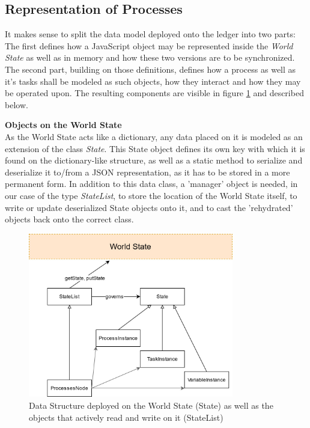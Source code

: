 \subsection{Representation of Processes}
\label{sec:impr:hl:datastructure}

It makes sense to split the data model deployed onto the ledger into two parts: The first defines how a JavaScript object may be represented inside the \emph{World State} as well as in memory and how these two versions are to be synchronized. The second part, building on those definitions, defines how a process as well as it's tasks shall be modeled as such objects, how they interact and how they may be operated upon. The resulting components are visible in figure \ref{fig:impr:hl:data} and described below.

\textbf{Objects on the World State} \\[0.2em]
As the World State acts like a dictionary, any data placed on it is modeled as an extension of the class \emph{State}. This State object defines its own key with which it is found on the dictionary-like structure, as well as a static method to serialize and deserialize it to/from a JSON representation, as it has to be stored in a more permanent form. \newline
In addition to this data class, a 'manager' object is needed, in our case of the type \emph{StateList}, to store the location of the World State itself, to write or update deserialized State objects onto it, and to cast the 'rehydrated' objects back onto the correct class.

\begin{figure}[h]
	\centering
	\captionsetup{justification=centering,margin=2cm}
	\includegraphics[width=0.8\textwidth]{gfx/hl-data}
	\caption{Data Structure deployed on the World State (State) as well as the objects that actively read and write on it (StateList)}
	\label{fig:impr:hl:data}
\end{figure}


